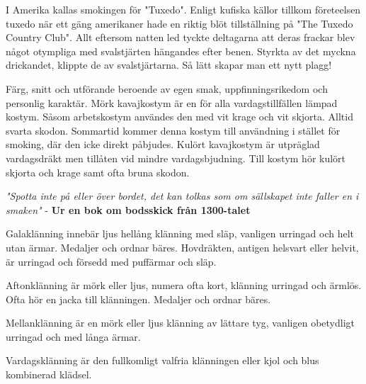     I Amerika kallas smokingen för "Tuxedo". Enligt kufiska källor tillkom företeelsen tuxedo när ett gäng amerikaner hade en riktig blöt tillställning på "The Tuxedo Country Club". Allt eftersom natten led tyckte deltagarna att deras frackar blev något otympliga med svalstjärten hängandes efter benen. Styrkta av det myckna drickandet, klippte de av svalstjärtarna. Så lätt skapar man ett nytt plagg!


    Färg, snitt och utförande beroende av egen smak, uppfinningsrikedom och personlig karaktär. Mörk kavajkostym är en för alla vardagstillfällen lämpad kostym. Såsom arbetskostym användes den med vit krage och vit skjorta. Alltid svarta skodon. Sommartid kommer denna kostym till användning i stället för smoking, där den icke direkt påbjudes. Kulört kavajkostym är utpräglad vardagsdräkt men tillåten vid mindre vardagsbjudning. Till kostym hör kulört skjorta och krage samt ofta bruna skodon.

    \textit{"Spotta inte på eller över bordet, det kan tolkas som om sällskapet inte faller en i smaken"} - \textbf{Ur en bok om bodsskick från 1300-talet}

    Galaklänning innebär ljus hellång klänning med släp, vanligen urringad och helt utan ärmar. Medaljer och ordnar bäres. Hovdräkten, antigen helsvart eller helvit, är urringad och försedd med puffärmar och släp.

    Aftonklänning är mörk eller ljus, numera ofta kort, klänning urringad och ärmlös. Ofta hör en jacka till klänningen. Medaljer och ordnar bäres.

    Mellanklänning är en mörk eller ljus klänning av lättare tyg, vanligen obetydligt urringad och med långa ärmar.

    Vardagsklänning är den fullkomligt valfria klänningen eller kjol och blus kombinerad klädsel.
    

    
    

    \newpage